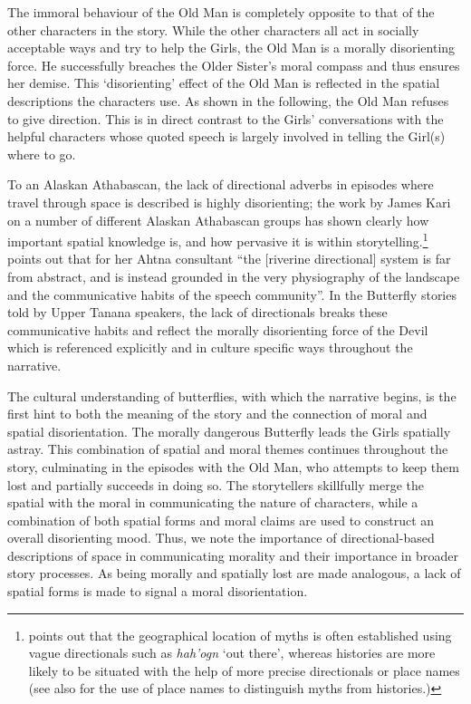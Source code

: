 The immoral behaviour of the Old Man is completely opposite to that of the other characters in the story. While the other characters all act in socially acceptable ways and try to help the Girls, the Old Man is a morally disorienting force. He successfully breaches the Older Sister's moral compass and thus ensures her demise. This `disorienting' effect of the Old Man is reflected in the spatial descriptions the characters use. As shown in the following, the Old Man refuses to give direction. This is in direct contrast to the Girls' conversations with the helpful characters whose quoted speech is largely involved in telling the Girl(s) where to go.

To an Alaskan Athabascan, the lack of directional adverbs in episodes where travel through space is described is highly disorienting; the work by James Kari on a number of different Alaskan Athabascan groups \citep{KariJ1985, KariJ1986, KariJ1989, KariJ2010, KariJFallJ2003} has shown clearly how important spatial knowledge is, and how pervasive it is within storytelling.\footnote{\citet{LovickO2012b-genre} points out that the geographical location of myths is often established using vague directionals such as {\em hah'ogn} `out there', whereas histories are more likely to be situated with the help of more precise directionals or place names (see also \citealp[x]{KariJ1986} for the use of place names to distinguish myths from histories.)} \citet[50]{BerezA2011diss} points out that for her Ahtna consultant ``the [riverine directional] system is far from abstract, and is instead grounded in the very physiography of the landscape and the communicative habits of the speech community''. In the Butterfly stories told by Upper Tanana speakers, the lack of directionals breaks these communicative habits and reflect the morally disorienting force of the Devil which is referenced explicitly and in culture specific ways throughout the narrative.

The cultural understanding of butterflies, with which the narrative begins, is the first hint to both the meaning of the story and the connection of moral and spatial disorientation. The morally dangerous Butterfly leads the Girls spatially astray. This combination of spatial and moral themes continues throughout the story, culminating in the episodes with the Old Man, who attempts to keep them lost and partially succeeds in doing so. The storytellers skillfully merge the spatial with the moral in communicating the nature of characters, while a combination of both spatial forms and moral claims are used to construct an overall disorienting mood. Thus, we note the importance of directional-based descriptions of space in communicating morality and their importance in broader story processes. As being morally and spatially lost are made analogous, a lack of spatial forms is made to signal a moral disorientation.

